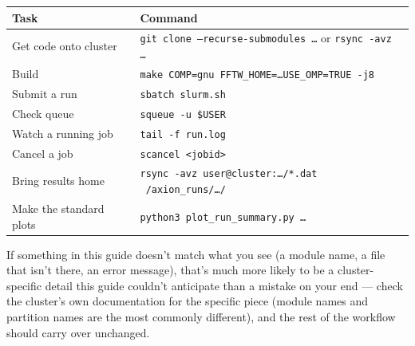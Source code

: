 \documentclass[11pt]{article}
\begin{document}
\begin{tabularx}{\textwidth}{@{}>{\raggedright\arraybackslash}p{3.6cm} X@{}}
\toprule
\textbf{Task} & \textbf{Command} \\
\midrule
Get code onto cluster & \texttt{git clone --recurse-submodules \dots} or \texttt{rsync -avz \dots} \\
Build & \texttt{make COMP=gnu FFTW\_HOME=\dots USE\_OMP=TRUE -j8} \\
Submit a run & \texttt{sbatch slurm.sh} \\
Check queue & \texttt{squeue -u \$USER} \\
Watch a running job & \texttt{tail -f run.log} \\
Cancel a job & \texttt{scancel <jobid>} \\
Bring results home & \texttt{rsync -avz user@cluster:\dots/*.dat ~/axion\_runs/\dots/} \\
Make the standard plots & \texttt{python3 plot\_run\_summary.py \dots} \\
\bottomrule
\end{tabularx}

\vspace{0.5cm}
\begin{note}
If something in this guide doesn't match what you see (a module name, a file that isn't there, an error
message), that's much more likely to be a cluster-specific detail this guide couldn't anticipate than a
mistake on your end --- check the cluster's own documentation for the specific piece (module names and
partition names are the most commonly different), and the rest of the workflow should carry over unchanged.
\end{note}
\end{document}
